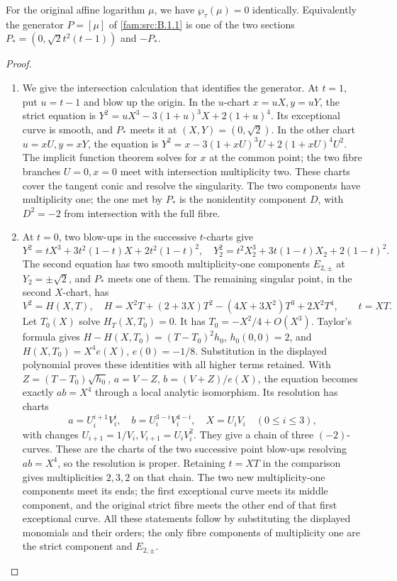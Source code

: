 \begin{proposition}\hypertarget{tag-01Q9}{}\label{fam:src:B.1.3}\label{fam:st:B.1.3}

For the original affine logarithm $\mu$, we have $\wp_\tau(\mu)=0$ identically. Equivalently the generator $P=[\mu]$ of \ref{fam:src:B.1.1} is one of the two sections $P_*=(0,\sqrt2t^2(t-1))$ and $-P_*$.
\end{proposition}


\begin{proof}
\begin{enumerate}[label=\arabic*.,leftmargin=*]
\item We give the intersection calculation that identifies the generator. At $t=1$, put $u=t-1$ and blow up the origin. In the $u$-chart $x=uX,y=uY$, the strict equation is
$Y^2=uX^3-3(1+u)^3X+2(1+u)^4$. Its exceptional curve is smooth, and $P_*$ meets it at $(X,Y)=(0,\sqrt2)$. In the other chart $u=xU,y=xY$, the equation is $Y^2=x-3(1+xU)^3U+2(1+xU)^4U^2$. The implicit function theorem solves for $x$ at the common point; the two fibre branches $U=0,x=0$ meet with intersection multiplicity two. These charts cover the tangent conic and resolve the singularity. The two components have multiplicity one; the one met by $P_*$ is the nonidentity component $D$, with $D^2=-2$ from intersection with the full fibre.

\item At $t=0$, two blow-ups in the successive $t$-charts give
\[
 Y^2=tX^3+3t^2(1-t)X+2t^2(1-t)^2,
\quad
 Y_2^2=t^2X_2^3+3t(1-t)X_2+2(1-t)^2.
\]
The second equation has two smooth multiplicity-one components $E_{2,\pm}$ at $Y_2=\pm\sqrt2$, and $P_*$ meets one of them. The remaining singular point, in the second $X$-chart, has
\[
 V^2=H(X,T),\quad H=X^2T+(2+3X)T^2-(4X+3X^2)T^3+2X^2T^4,
 \qquad t=XT.
\]
Let $T_0(X)$ solve $H_T(X,T_0)=0$. It has $T_0=-X^2/4+O(X^3)$. Taylor's formula gives
$H-H(X,T_0)=(T-T_0)^2h_0$, $h_0(0,0)=2$, and $H(X,T_0)=X^4e(X)$, $e(0)=-1/8$. Substitution in the displayed polynomial proves these identities with all higher terms retained. With $Z=(T-T_0)\sqrt{h_0}$, $a=V-Z$, $b=(V+Z)/e(X)$, the equation becomes exactly $ab=X^4$ through a local analytic isomorphism. Its resolution has charts
\[
 a=U_i^{i+1}V_i^i,\quad b=U_i^{3-i}V_i^{4-i},\quad X=U_iV_i
 \quad(0\le i\le3),
\]
with changes $U_{i+1}=1/V_i,V_{i+1}=U_iV_i^2$. They give a chain of three $(-2)$-curves. These are the charts of the two successive point blow-ups resolving $ab=X^4$, so the resolution is proper. Retaining $t=XT$ in the comparison gives multiplicities $2,3,2$ on that chain. The two new multiplicity-one components meet its ends; the first exceptional curve meets its middle component, and the original strict fibre meets the other end of that first exceptional curve. All these statements follow by substituting the displayed monomials and their orders; the only fibre components of multiplicity one are the strict component and $E_{2,\pm}$.


\end{enumerate}
\end{proof}
